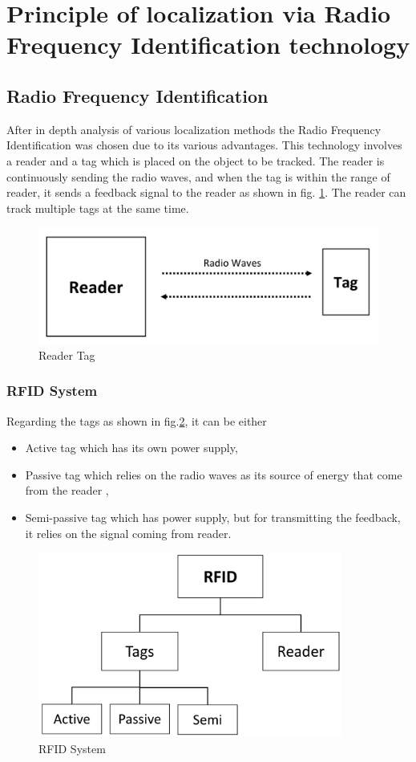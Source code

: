 \section{Principle of localization via Radio Frequency Identification technology} \label{Sec_theor}
\subsection{Radio Frequency Identification}
After in depth analysis of various localization methods the Radio Frequency Identification\cite{rfid.application}\cite{rfid.application2} was chosen due to its various advantages.
This technology involves a reader and a tag which is placed on the object to be tracked. The reader is continuously sending the radio waves, and when the tag is within the range of reader, it sends a feedback signal to the reader as shown in fig. \ref{reader_tag}. The reader can track multiple tags at the same time.
\begin{figure}[!htbp]
	\centering
	\includegraphics[width = 13cm]{Pictures/readertag}
	\caption{Reader Tag}
	\label{reader_tag}
\end{figure}
\subsubsection{RFID System}
Regarding the tags as shown in fig.\ref{rfid_system}, it can be either
\begin{itemize}
	\item Active tag which has its own power supply, 
	\item Passive tag which relies on the radio waves as its source of energy that come from the reader , 
	\item Semi-passive tag which has power supply, but for transmitting the feedback, it relies on the signal coming from reader.
\end{itemize}
\begin{figure}[!htbp]
	\centering
	\includegraphics[width = 10cm]{Pictures/rfidsystem}
	\caption{RFID System}
	\label{rfid_system}
\end{figure}
